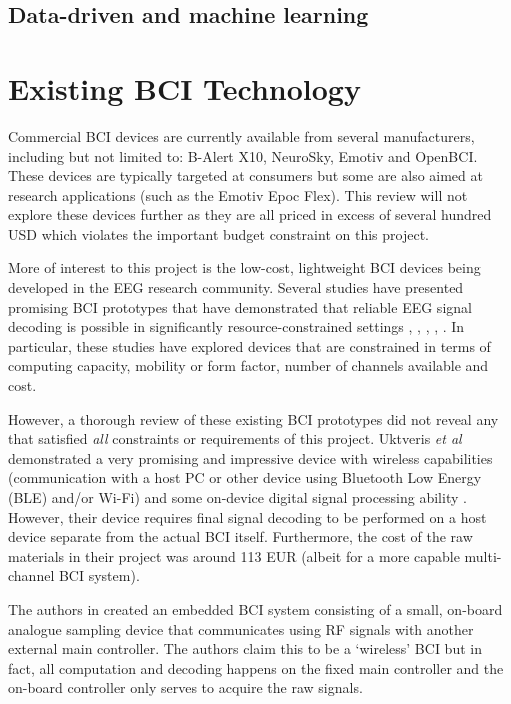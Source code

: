 \subsection{Data-driven and machine learning}

\section{Existing BCI Technology}
\label{section:existing-bci-tech-c2}
Commercial BCI devices are currently available from several manufacturers, including but not limited to: B-Alert X10, NeuroSky, Emotiv and OpenBCI. These devices are typically targeted at consumers but some are also aimed at research applications (such as the Emotiv Epoc Flex). This review will not explore these devices further as they are all priced in excess of several hundred USD which violates the important budget constraint on this project.

More of interest to this project is the low-cost, lightweight BCI devices being developed in the EEG research community. Several studies have presented promising BCI prototypes that have demonstrated that reliable EEG signal decoding is possible in significantly resource-constrained settings \cite{uktveris-modular-bci}, \cite{de-vos-p300-speller}, \cite{liao-gaming-control}, \cite{chai-embedded-bci}, \cite{acampora-svm-clf}. In particular, these studies have explored devices that are constrained in terms of computing capacity, mobility or form factor, number of channels available and cost. 

However, a thorough review of these existing BCI prototypes did not reveal any that satisfied \textit{all} constraints or requirements of this project. Uktveris \textit{et al} demonstrated a very promising and impressive device with wireless capabilities (communication with a host PC or other device using Bluetooth Low Energy (BLE) and/or Wi-Fi) and some on-device digital signal processing ability \cite{uktveris-modular-bci}. However, their device requires final signal decoding to be performed on a host device separate from the actual BCI itself. Furthermore, the cost of the raw materials in their project was around 113 EUR \cite{uktveris-modular-bci} (albeit for a more capable multi-channel BCI system).

The authors in \cite{chai-embedded-bci} created an embedded BCI system consisting of a small, on-board analogue sampling device that communicates using RF signals with another external main controller. The authors claim this to be a `wireless' BCI but in fact, all computation and decoding happens on the fixed main controller and the on-board controller only serves to acquire the raw signals. 

